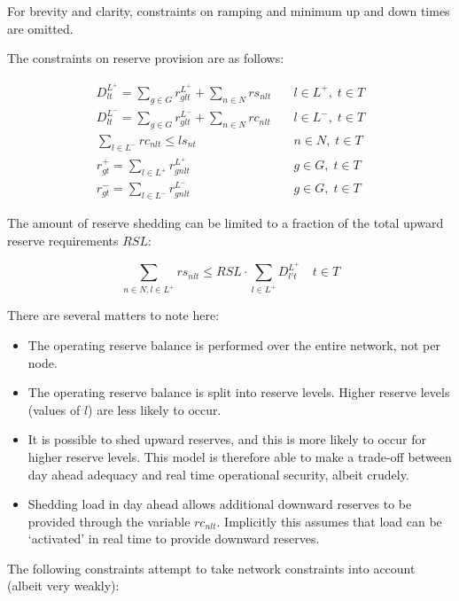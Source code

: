 \documentclass[number,times]{elsarticle}
\begin{document}
For brevity and clarity, constraints on ramping and minimum up and down times are omitted.

The constraints on reserve provision are as follows:

\begin{align}
    D^{L^+}_{lt} = \sum_{g \in G} r^{L^+}_{glt} + \sum_{n \in N} rs_{nlt} & \quad l \in L^+, \; t \in T \\
    D^{L^-}_{lt} = \sum_{g \in G} r^{L^-}_{glt} + \sum_{n \in N} rc_{nlt} & \quad l \in L^-, \; t \in T \\
    \sum_{l \in L^-} rc_{nlt} \leq ls_{nt}                                & \quad n \in N, \; t \in T   \\
    r^{+}_{gt} = \sum_{l \in L^+} r^{L^+}_{gnlt}                          & \quad g \in G, \; t \in T   \\
    r^{-}_{gt} = \sum_{l \in L^-} r^{L^-}_{gnlt}                          & \quad g \in G, \; t \in T
\end{align}

The amount of reserve shedding can be limited to a fraction of the total upward reserve requirements $RSL$:

\begin{equation}
    \sum_{n \in N, l \in L^+} rs_{nlt} \leq RSL \cdot \sum_{l \in L^+} D^{L^+}_{l't} \quad t \in T
\end{equation}

There are several matters to note here:

\begin{itemize}
    \item The operating reserve balance is performed over the entire network, not per node.
    \item The operating reserve balance is split into reserve levels. Higher reserve levels (values of $l$) are less likely to occur.
    \item It is possible to shed upward reserves, and this is more likely to occur for higher reserve levels. This model is therefore able to make a trade-off between day ahead adequacy and real time operational security, albeit crudely.
    \item Shedding load in day ahead allows additional downward reserves to be provided through the variable $rc_{nlt}$. Implicitly this assumes that load can be `activated' in real time to provide downward reserves.
\end{itemize}

The following constraints attempt to take network constraints into account (albeit very weakly):
\end{document}
